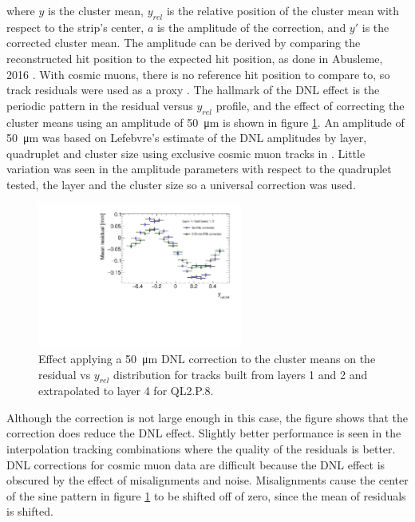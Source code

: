 where $y$ is the cluster mean, $y_{rel}$ is the relative position of the cluster mean with respect to the strip's center, $a$ is the amplitude of the correction, and $y'$ is the corrected cluster mean. The amplitude can be derived by comparing the reconstructed hit position to the expected hit position, as done in Abusleme, 2016 \cite{abusleme_performance_2016}. With cosmic muons, there is no reference hit position to compare to, so track residuals were used as a proxy \cite{lefebvre_thesis}. The hallmark of the DNL effect is the periodic pattern in the residual versus $y_{rel}$ profile, and the effect of correcting the cluster means using an amplitude of \SI{50}{\micro\meter} is shown in figure \ref{fig:dnl_corr_effect}. An amplitude of \SI{50}{\micro\meter} was based on Lefebvre's estimate of the DNL amplitudes by layer, quadruplet and cluster size using exclusive cosmic muon tracks in . Little variation was seen in the amplitude parameters with respect to the quadruplet tested, the layer and the cluster size so a universal correction was used.

\begin{figure}
    \centering
    \includegraphics[width = 0.6\textwidth]{figures/figure_dnl_profiles_blue_QL2P08_3100V_2021-06-18_no_dnl_green_QL2P08_3100V_2021-06-18_2_50um_universal_DNL_layer4_fixed12.pdf}
    \caption{Effect applying a \SI{50}{\micro\meter} DNL correction to the cluster means on the residual vs $y_{rel}$ distribution for tracks built from layers 1 and 2 and extrapolated to layer 4 for QL2.P.8.}
    \label{fig:dnl_corr_effect}
\end{figure} 

Although the correction is not large enough in this case, the figure shows that the correction does reduce the DNL effect. Slightly better performance is seen in the interpolation tracking combinations where the quality of the residuals is better. DNL corrections for cosmic muon data are difficult because the DNL effect is obscured by the effect of misalignments and noise. Misalignments cause the center of the sine pattern in figure \ref{fig:dnl_corr_effect} to be shifted off of zero, since the mean of residuals is shifted.

